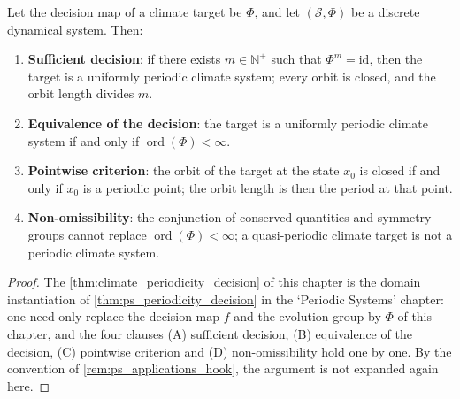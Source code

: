 \begin{theorem}\label{thm:climate_periodicity_decision}
Let the decision map of a climate target be $\Phi$, and let $(\mathcal S,\Phi)$ be a discrete dynamical system. Then:
\begin{enumerate}[label=(\Alph*)]
    \item \textbf{Sufficient decision}: if there exists $m\in\mathbb N^+$ such that $\Phi^m=\mathrm{id}$, then the target is a uniformly periodic climate system; every orbit is closed, and the orbit length divides $m$.
    \item \textbf{Equivalence of the decision}: the target is a uniformly periodic climate system if and only if $\operatorname{ord}(\Phi)<\infty$.
    \item \textbf{Pointwise criterion}: the orbit of the target at the state $x_0$ is closed if and only if $x_0$ is a periodic point; the orbit length is then the period at that point.
    \item \textbf{Non-omissibility}: the conjunction of conserved quantities and symmetry groups cannot replace $\operatorname{ord}(\Phi)<\infty$; a quasi-periodic climate target is not a periodic climate system.
\end{enumerate}
\end{theorem}

\begin{proof}
The \cref{thm:climate_periodicity_decision} of this chapter is the domain instantiation of \cref{thm:ps_periodicity_decision} in the `Periodic Systems' chapter:
one need only replace the decision map $f$ and the evolution group by $\Phi$ of this chapter, and the four clauses (A) sufficient decision, (B) equivalence of the decision, (C) pointwise criterion and
(D) non-omissibility hold one by one. By the convention of \cref{rem:ps_applications_hook}, the argument is not expanded again here.
\end{proof}

